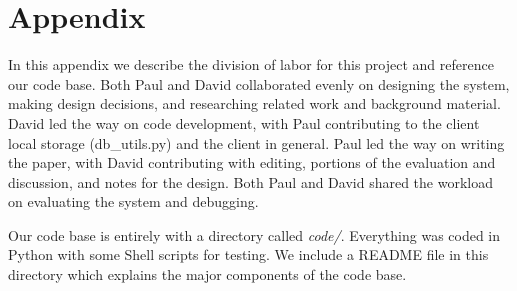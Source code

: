 \newpage
\section{Appendix}
\label{appendix}
In this appendix we describe the division of labor for this project and reference our code base.
Both Paul and David collaborated evenly on designing the system,
making design decisions,
and researching related work and background material.
David led the way on code development,
with Paul contributing to the client local storage (db_utils.py)
and the client in general.
Paul led the way on writing the paper, with
David contributing with editing, portions of the evaluation and discussion,
and notes for the design.
Both Paul and David shared the workload on evaluating the system and debugging.

Our code base is entirely with a directory called \emph{code/}.
Everything was coded in Python with some Shell scripts for testing.
We include a README file in this directory which explains the major components
of the code base.
